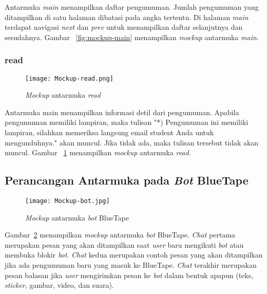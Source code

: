 Antarmuka \textit{main} menampilkan daftar pengumuman. Jumlah pengumuman yang ditampilkan di satu halaman dibatasi pada angka tertentu. Di halaman \textit{main} terdapat navigasi \textit{next} dan \textit{prev} untuk menampilkan daftar selanjutnya dan sesudahnya. Gambar~ \ref{fig:mockup-main} menampilkan \textit{mockup} antarmuka \textit{main}.

\subsubsection{read}

\begin{figure}[H]
	\centering  
	\texttt{[image: Mockup-read.png]}  
	\caption[\textit{Mockup} antarmuka \textit{read}]{\textit{Mockup} antarmuka \textit{read}} 
	\label{fig:mockup-read} 
\end{figure}

Antarmuka main menampilkan informasi detil dari pengumuman. Apabila pengumuman memiliki lampiran, maka tulisan "*) Pengumuman ini memiliki lampiran, silahkan memeriksa langsung email student Anda untuk mengunduhnya." akan muncul. Jika tidak ada, maka tulisan tersebut tidak akan muncul. Gambar~ \ref{fig:mockup-read} menampilkan \textit{mockup} antarmuka \textit{read}.

\subsection{Perancangan Antarmuka pada \textit{Bot} BlueTape}

\begin{figure}[H]
	\centering  
	\texttt{[image: Mockup-bot.jpg]}  
	\caption[\textit{Mockup} antarmuka \textit{bot} BlueTape]{\textit{Mockup} antarmuka \textit{bot} BlueTape} 
	\label{fig:mockup-bot} 
\end{figure}

Gambar~\ref{fig:mockup-bot} menampilkan \textit{mockup} antarmuka \textit{bot} BlueTape. \textit{Chat} pertama merupakan pesan yang akan ditampilkan saat \textit{user} baru mengikuti \textit{bot} atau membuka blokir \textit{bot}. \textit{Chat} kedua merupakan contoh pesan yang akan ditampilkan jika ada pengumuman baru yang masuk ke BlueTape. \textit{Chat} terakhir merupakan pesan balasan jika \textit{user} mengirimkan pesan ke \textit{bot} dalam bentuk apapun (teks, \textit{sticker}, gambar, video, dan suara).